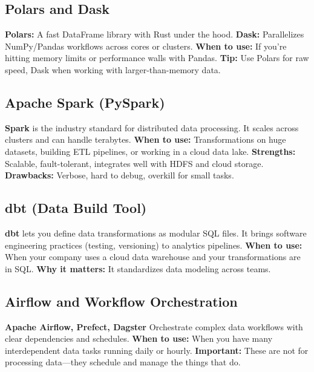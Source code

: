 \documentclass[12pt,openany]{book}
\begin{document}
\subsection*{Polars and Dask}

\textbf{Polars:} A fast DataFrame library with Rust under the hood. \newline
\textbf{Dask:} Parallelizes NumPy/Pandas workflows across cores or clusters. \newline
\textbf{When to use:} If you're hitting memory limits or performance walls with Pandas. \newline
\textbf{Tip:} Use Polars for raw speed, Dask when working with larger-than-memory data.

\subsection*{Apache Spark (PySpark)}

\textbf{Spark} is the industry standard for distributed data processing. It scales across clusters and can handle terabytes. \newline
\textbf{When to use:} Transformations on huge datasets, building ETL pipelines, or working in a cloud data lake. \newline
\textbf{Strengths:} Scalable, fault-tolerant, integrates well with HDFS and cloud storage. \newline
\textbf{Drawbacks:} Verbose, hard to debug, overkill for small tasks.

\subsection*{dbt (Data Build Tool)}

\textbf{dbt} lets you define data transformations as modular SQL files. It brings software engineering practices (testing, versioning) to analytics pipelines. \newline
\textbf{When to use:} When your company uses a cloud data warehouse and your transformations are in SQL. \newline
\textbf{Why it matters:} It standardizes data modeling across teams.

\subsection*{Airflow and Workflow Orchestration}

\textbf{Apache Airflow, Prefect, Dagster} \newline
Orchestrate complex data workflows with clear dependencies and schedules. \newline
\textbf{When to use:} When you have many interdependent data tasks running daily or hourly. \newline
\textbf{Important:} These are not for processing data—they schedule and manage the things that do.
\end{document}
